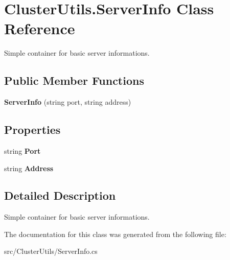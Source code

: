 \hypertarget{class_cluster_utils_1_1_server_info}{}\section{Cluster\+Utils.\+Server\+Info Class Reference}
\label{class_cluster_utils_1_1_server_info}


Simple container for basic server informations.  


\subsection*{Public Member Functions}
\begin{DoxyCompactItemize}
\item 
\hypertarget{class_cluster_utils_1_1_server_info_a095b6bb7f69811d50212929a82339442}{}{\bfseries Server\+Info} (string port, string address)\label{class_cluster_utils_1_1_server_info_a095b6bb7f69811d50212929a82339442}

\end{DoxyCompactItemize}
\subsection*{Properties}
\begin{DoxyCompactItemize}
\item 
\hypertarget{class_cluster_utils_1_1_server_info_add382573fe9a95890b2ce2c47ffd4d70}{}string {\bfseries Port}\label{class_cluster_utils_1_1_server_info_add382573fe9a95890b2ce2c47ffd4d70}

\item 
\hypertarget{class_cluster_utils_1_1_server_info_a06bfc80fbfb63af5237dbae97df20dda}{}string {\bfseries Address}\label{class_cluster_utils_1_1_server_info_a06bfc80fbfb63af5237dbae97df20dda}

\end{DoxyCompactItemize}


\subsection{Detailed Description}
Simple container for basic server informations. 



The documentation for this class was generated from the following file\+:\begin{DoxyCompactItemize}
\item 
src/\+Cluster\+Utils/Server\+Info.\+cs\end{DoxyCompactItemize}
